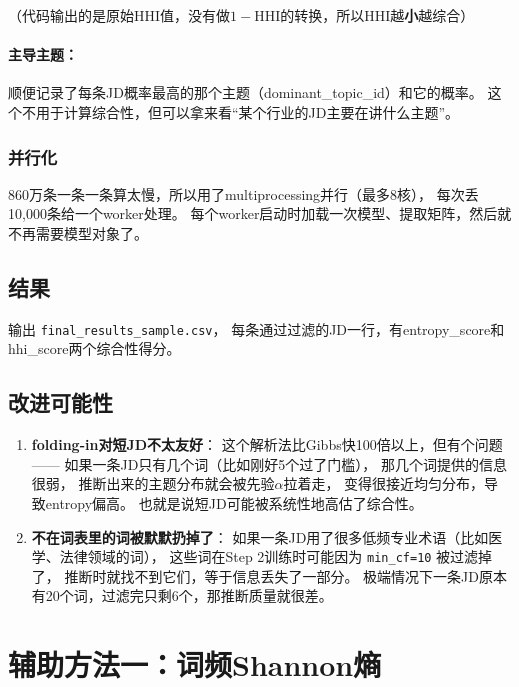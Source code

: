 \documentclass[12pt,a4paper]{ctexart}
\begin{document}
（代码输出的是原始HHI值，没有做$1 - \text{HHI}$的转换，所以HHI越\textbf{小}越综合）

\paragraph{主导主题：}
顺便记录了每条JD概率最高的那个主题（dominant\_topic\_id）和它的概率。
这个不用于计算综合性，但可以拿来看``某个行业的JD主要在讲什么主题''。

\subsubsection{并行化}
860万条一条一条算太慢，所以用了multiprocessing并行（最多8核），
每次丢10,000条给一个worker处理。
每个worker启动时加载一次模型、提取矩阵，然后就不再需要模型对象了。

\subsection{结果}
输出 \texttt{final\_results\_sample.csv}，
每条通过过滤的JD一行，有entropy\_score和hhi\_score两个综合性得分。

\subsection{改进可能性}
\begin{enumerate}
\item \textbf{folding-in对短JD不太友好}：
这个解析法比Gibbs快100倍以上，但有个问题——
如果一条JD只有几个词（比如刚好5个过了门槛），
那几个词提供的信息很弱，
推断出来的主题分布就会被先验$\alpha$拉着走，
变得很接近均匀分布，导致entropy偏高。
也就是说短JD可能被系统性地高估了综合性。

\item \textbf{不在词表里的词被默默扔掉了}：
如果一条JD用了很多低频专业术语（比如医学、法律领域的词），
这些词在Step 2训练时可能因为 \texttt{min\_cf=10} 被过滤掉了，
推断时就找不到它们，等于信息丢失了一部分。
极端情况下一条JD原本有20个词，过滤完只剩6个，那推断质量就很差。
\end{enumerate}


\section{辅助方法一：词频Shannon熵}
\label{sec:word_entropy}
\end{document}
